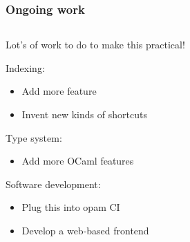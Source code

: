 \documentclass[aspectratio=169,dvipsnames,svgnames,10pt]{beamer}
\begin{document}
\begin{frame}
  \frametitle{Ongoing work}

  \begin{columns}
    \begin{column}{0.6\textwidth}
      
    Lot's of work to do to make this practical!

    \vspace{1em}
    Indexing:
    \begin{itemize}
    \item Add more feature
    \item Invent new kinds of shortcuts
    \end{itemize}
    \vspace{1em}

    Type system:\\
    \begin{itemize}
    \item Add more OCaml features
    \end{itemize}

    \vspace{1em}
    
    Software development:
    \begin{itemize}
    \item Plug this into opam CI
    \item Develop a web-based frontend
    \end{itemize}
    \end{column}
        

\end{columns}
\end{frame}
\end{document}
